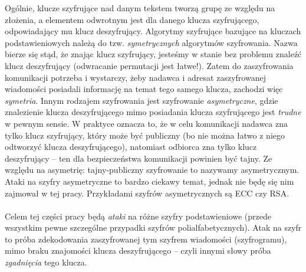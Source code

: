 \documentclass[a4paper]{article}
\theoremstyle{defn}
\theoremstyle{theorem}
\theoremstyle{lemma}
\theoremstyle{cor}
\theoremstyle{fact}
\begin{document}
Ogólnie, klucze szyfrujące nad danym tekstem tworzą grupę ze względu na złożenia, a elementem odwrotnym jest dla danego klucza szyfrującego, odpowiadający mu klucz deszyfrujący. Algorytmy szyfrujące bazujące na kluczach podstawieniowych należą do tzw. \textit{symetrycznych} algorytmów szyfrowania. Nazwa bierze się stąd, że znając klucz szyfrujący, jesteśmy w stanie bez problemu znaleźć klucz deszyfrujący (odwracanie permutacji jest łatwe!). Zatem do zaszyfrowania komunikacji potrzeba i wystarczy, żeby nadawca i adresat zaszyfrowanej wiadomości posiadali informację na temat tego samego klucza, zachodzi więc \textit{symetria}. Innym rodzajem szyfrowania jest szyfrowanie \textit{asymetryczne}, gdzie znalezienie klucza deszyfrującego mimo posiadania klucza szyfrującego jest \textit{trudne} w pewnym sensie. W praktyce oznacza to, że w celu komunikacji nadawca zna tylko klucz szyfrujący, który może być publiczny (bo nie można łatwo z niego odtworzyć klucza deszyfrującego), natomiast odbiorca zna tylko klucz deszyfrujący – ten dla bezpieczeństwa komunikacji powinien być tajny. Ze względu na asymetrię: tajny-publiczny szyfrowanie to nazywamy asymetrycznym. Ataki na szyfry asymetryczne to bardzo ciekawy temat, jednak nie będę się nim zajmował w tej pracy. Przykładami szyfrów asymetrycznych są ECC czy RSA.
\\\\

Celem tej części pracy będą \textit{ataki} na różne szyfry podstawieniowe (przede wszystkim pewne szczególne przypadki szyfrów polialfabetycznych). Atak na szyfr to próba zdekodowania zaszyfrowanej tym szyfrem wiadomości (szyfrogramu), mimo braku znajomości klucza deszyfrującego – czyli innymi słowy próba \textit{zgadnięcia} tego klucza.
\\\\
\end{document}

